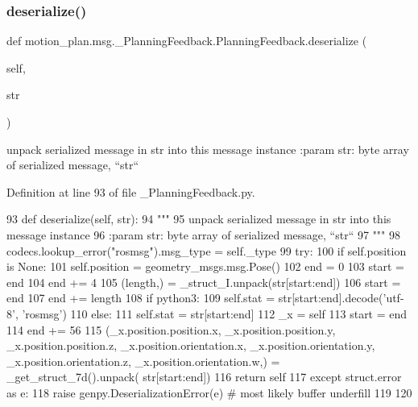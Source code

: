 \subsubsection{\texorpdfstring{deserialize()}{deserialize()}}
{\footnotesize\ttfamily def motion\+\_\+plan.\+msg.\+\_\+\+Planning\+Feedback.\+Planning\+Feedback.\+deserialize (\begin{DoxyParamCaption}\item[{}]{self,  }\item[{}]{str }\end{DoxyParamCaption})}

\begin{DoxyVerb}unpack serialized message in str into this message instance
:param str: byte array of serialized message, ``str``
\end{DoxyVerb}
 

Definition at line 93 of file \+\_\+\+Planning\+Feedback.\+py.


\begin{DoxyCode}
93   \textcolor{keyword}{def }deserialize(self, str):
94     \textcolor{stringliteral}{"""}
95 \textcolor{stringliteral}{    unpack serialized message in str into this message instance}
96 \textcolor{stringliteral}{    :param str: byte array of serialized message, ``str``}
97 \textcolor{stringliteral}{    """}
98     codecs.lookup\_error(\textcolor{stringliteral}{"rosmsg"}).msg\_type = self.\_type
99     \textcolor{keywordflow}{try}:
100       \textcolor{keywordflow}{if} self.position \textcolor{keywordflow}{is} \textcolor{keywordtype}{None}:
101         self.position = geometry\_msgs.msg.Pose()
102       end = 0
103       start = end
104       end += 4
105       (length,) = \_struct\_I.unpack(str[start:end])
106       start = end
107       end += length
108       \textcolor{keywordflow}{if} python3:
109         self.stat = str[start:end].decode(\textcolor{stringliteral}{'utf-8'}, \textcolor{stringliteral}{'rosmsg'})
110       \textcolor{keywordflow}{else}:
111         self.stat = str[start:end]
112       \_x = self
113       start = end
114       end += 56
115       (\_x.position.position.x, \_x.position.position.y, \_x.position.position.z, \_x.position.orientation.x, 
      \_x.position.orientation.y, \_x.position.orientation.z, \_x.position.orientation.w,) = \_get\_struct\_7d().unpack(
      str[start:end])
116       \textcolor{keywordflow}{return} self
117     \textcolor{keywordflow}{except} struct.error \textcolor{keyword}{as} e:
118       \textcolor{keywordflow}{raise} genpy.DeserializationError(e)  \textcolor{comment}{# most likely buffer underfill}
119 
120 
\end{DoxyCode}
\mbox{\label{classmotion__plan_1_1msg_1_1__PlanningFeedback_1_1PlanningFeedback_a192532502f567745b8856eb21f962e60}} 
